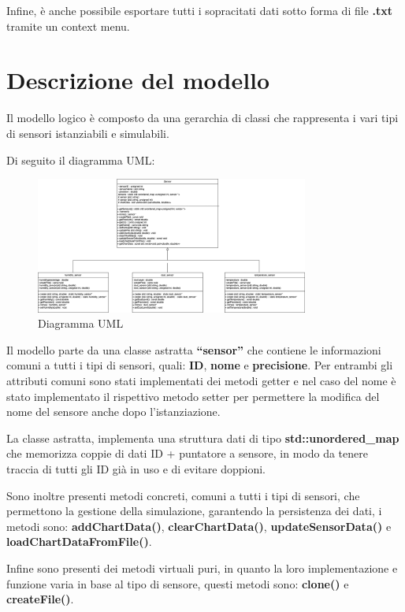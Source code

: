 \documentclass{article}
\begin{document}
    Infine, è anche possibile esportare tutti i sopracitati dati sotto forma di file \textbf{.txt} tramite un context menu.

    \section{Descrizione del modello}
    Il modello logico è composto da una gerarchia di classi che rappresenta i vari tipi di sensori istanziabili e simulabili. 
        
    Di seguito il diagramma UML:    
    \begin{figure}[h!]
        \centering
        \includegraphics[width=0.8\textwidth]{UML.png}
        \caption*{Diagramma UML}
    \end{figure}

    \newpage
    \noindent Il modello parte da una classe astratta \textbf{“sensor”} che contiene le informazioni comuni a tutti i tipi di sensori, quali: \textbf{ID}, \textbf{nome} e \textbf{precisione}.
    Per entrambi gli attributi comuni sono stati implementati dei metodi getter e nel caso del nome è stato implementato il rispettivo metodo setter per permettere la modifica del nome del sensore anche dopo l’istanziazione. 

    \noindent La classe astratta, implementa una struttura dati di tipo \textbf{std::unordered\_map} che memorizza coppie di dati ID + puntatore a sensore, in modo da tenere traccia di tutti gli ID già in uso e di evitare doppioni.

    \noindent Sono inoltre presenti metodi concreti, comuni a tutti i tipi di sensori, che permettono la gestione della simulazione, garantendo la persistenza dei dati, i metodi sono:
    \textbf{addChartData()}, \textbf{clearChartData()}, \textbf{updateSensorData()} e \textbf{loadChartDataFromFile()}.

    \noindent Infine sono presenti dei metodi virtuali puri, in quanto la loro implementazione e funzione varia in base al tipo di sensore, questi metodi sono: \textbf{clone()} e \textbf{createFile()}.
\end{document}
